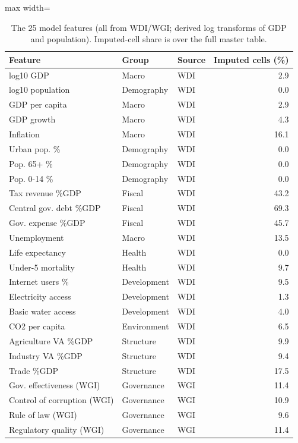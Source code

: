 \begin{table}[H]
\caption{The 25 model features (all from WDI/WGI; derived log transforms of GDP and population). Imputed-cell share is over the full master table.}\label{tab:features}
\centering\footnotesize
\renewcommand{\arraystretch}{1.0}
\begin{adjustbox}{max width=\linewidth}
\begin{tabular}{lllr}
\toprule
Feature & Group & Source & Imputed cells (\%) \\
\midrule
log10 GDP & Macro & WDI & 2.9 \\
log10 population & Demography & WDI & 0.0 \\
GDP per capita & Macro & WDI & 2.9 \\
GDP growth & Macro & WDI & 4.3 \\
Inflation & Macro & WDI & 16.1 \\
Urban pop. \% & Demography & WDI & 0.0 \\
Pop. 65+ \% & Demography & WDI & 0.0 \\
Pop. 0-14 \% & Demography & WDI & 0.0 \\
Tax revenue \%GDP & Fiscal & WDI & 43.2 \\
Central gov. debt \%GDP & Fiscal & WDI & 69.3 \\
Gov. expense \%GDP & Fiscal & WDI & 45.7 \\
Unemployment & Macro & WDI & 13.5 \\
Life expectancy & Health & WDI & 0.0 \\
Under-5 mortality & Health & WDI & 9.7 \\
Internet users \% & Development & WDI & 9.5 \\
Electricity access & Development & WDI & 1.3 \\
Basic water access & Development & WDI & 4.0 \\
CO2 per capita & Environment & WDI & 6.5 \\
Agriculture VA \%GDP & Structure & WDI & 9.9 \\
Industry VA \%GDP & Structure & WDI & 9.4 \\
Trade \%GDP & Structure & WDI & 17.5 \\
Gov. effectiveness (WGI) & Governance & WGI & 11.4 \\
Control of corruption (WGI) & Governance & WGI & 10.9 \\
Rule of law (WGI) & Governance & WGI & 9.6 \\
Regulatory quality (WGI) & Governance & WGI & 11.4 \\
\bottomrule
\end{tabular}\end{adjustbox}
\end{table}
